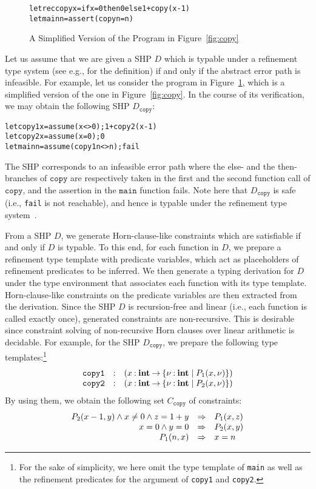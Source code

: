 \begin{figure}[t]
\begin{alltt}
letrec copy x = if x=0 then 0 else 1 + copy (x-1)
let main n = assert (copy n = n)
\end{alltt}
\caption{A Simplified Version of the Program in Figure~\ref{fig:copy}}
\label{fig:copy2}
\end{figure}

Let us assume that we are given a SHP \(D\) which is typable under a
refinement type system (see e.g., \cite{Unno2009} for the definition) if
and only if the abstract error path is infeasible.  For example, let us
consider the program in Figure~\ref{fig:copy2}, which is a simplified
version of the one in Figure~\ref{fig:copy}.  In the course of its
verification, we may obtain the following SHP \(D_{\texttt{copy}}\):
\begin{alltt}
 let copy1 x = assume (x<>0); 1 + copy2 (x-1)
 let copy2 x = assume (x=0); 0
 let main n = assume (copy1 n <> n); fail
\end{alltt}
The SHP corresponds to an infeasible error path where the else- and the
then-branches of \(\texttt{copy}\) are respectively taken in the first
and the second function call of \(\texttt{copy}\), and the assertion in
the \(\texttt{main}\) function fails.  Note here that
\(D_{\texttt{copy}}\) is safe (i.e., \texttt{fail} is not reachable),
and hence is typable under the refinement type system~\cite{Unno2009}.

From a SHP \(D\), we generate Horn-clause-like constraints which are
satisfiable if and only if \(D\) is typable.  To this end, for each
function in \(D\), we prepare a refinement type template with predicate
variables, which act as placeholders of refinement predicates to be
inferred.  We then generate a typing derivation for \(D\) under the type
environment that associates each function with its type template.
Horn-clause-like constraints on the predicate variables are then
extracted from the derivation.  Since the SHP \(D\) is recursion-free
and linear (i.e., each function is called exactly once), generated
constraints are non-recursive.  This is desirable since constraint
solving of non-recursive Horn clauses over linear arithmetic is
decidable.  For example, for the SHP \(D_{\texttt{copy}}\), we prepare
the following type templates:\footnote{For the sake of simplicity, we
here omit the type template of \texttt{main} as well as the refinement
predicates for the argument of \texttt{copy1} and \texttt{copy2}.}
\vspace{-2pt}
\[
\begin{array}{rcl}
\texttt{copy1}&\mathbin{:}&(x\mathbin{:}{\mathbf{int}}\mathbin{\rightarrow}{\{{\nu\mathbin{:}\mathbf{int} \mid P_1(x,\nu)}\}}) \\
\texttt{copy2}&\mathbin{:}&(x\mathbin{:}{\mathbf{int}}\mathbin{\rightarrow}{\{{\nu\mathbin{:}\mathbf{int} \mid P_2(x,\nu)}\}})
\end{array}
\]
By using them, we obtain the following set \(C_{\texttt{copy}}\) of
constraints:
\[
\begin{array}{rcl}
P_2(x-1,y) \land x\neq0 \land z=1+y &\Rightarrow& P_1(x,z) \\
x=0 \land y=0 &\Rightarrow& P_2(x,y) \\
P_1(n,x) &\Rightarrow& x=n
\end{array}
\]

